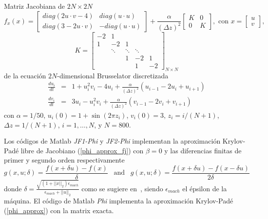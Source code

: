 \begin{example}
	\label{ej:ej1-hpfj} Matriz Jacobiana de $2N\times2N$
	\begin{equation*}
	f_{x}(x)=\left[ 
	\begin{array}{cc}
	diag(2u\cdot v-4) & diag(u\cdot u) \\ 
	diag(3-2u\cdot v) & -diag(u\cdot u)%
	\end{array}%
	\right] +\frac{\alpha }{(\Delta z)^{2}}\left[ 
	\begin{array}{cc}
	K & 0 \\ 
	0 & K%
	\end{array}%
	\right] ,\text{ \ \ \ con \ \ \ \ }x=\left[ 
	\begin{array}{c}
	u \\ 
	v%
	\end{array}%
	\right] ,
	\end{equation*}
	\[
	K=\left[ 
	\begin{array}{ccccc}
	-2 & 1 &  &  & \\
	1 & -2 & 1 &  &  \\
	& \ddots  & \ddots  & \ddots  &  \\
	&  & 1 & -2 & 1 \\
	&  &  & 1 & -2%
	\end{array}%
	\right]_{N\times N}
	\]
	de la  ecuación $2N$-dimensional Brusselator discretizada
	\begin{eqnarray*}
		\frac{du_{i}}{dt} &=&1+u_{i}^{2}v_{i}-4u_{i}+\frac{\alpha }{(\Delta z)^{2}}%
		(u_{i-1}-2u_{i}+u_{i+1}) \\
		\frac{dv_{i}}{dt} &=&3u_{i}-u_{i}^{2}v_{i}+\frac{\alpha }{(\Delta z)^{2}}%
		(v_{i-1}-2v_{i}+v_{i+1})
	\end{eqnarray*}
	con $\alpha =1/50$, $u_{i}(0)=1+\sin (2\pi z_{i})$, $v_{i}(0)=3$, $z_{i}=i/(N+1)$, $\Delta z =1/(N+1)$, $i=1,\ldots,N$, y $N=800$.
\end{example}

Los códigos de Matlab \textit{JF1-Phi} y \textit{JF2-Phi} implementan la aproximación Krylov-Padé libre de Jacobiano (\ref{phi_approx_fj}) con $\beta=0$ y las diferencias finitas de primer y segundo orden respectivamente
\begin{equation}\label{finite-differences}
	g(x,u;\delta)=\frac{f(x+\delta u)-f(x)}{\delta}  \;\;\; \text{and} \;\;\; g(x,u;\delta)=\frac{f(x+\delta u)-f(x-\delta u)}{2\delta}
\end{equation}
donde $\delta= \frac{\sqrt{(1+||x||_2)\epsilon_{mach}}}{\epsilon_{mach}+||u||_2}$ como se sugiere en~\cite{knoll2004jacobian}, siendo $\epsilon_{mach}$ el épsilon de la máquina. El código de Matlab \textit{Phi} implementa la aproximación Krylov-Padé (\ref{phi_approx}) con la matrix exacta.

